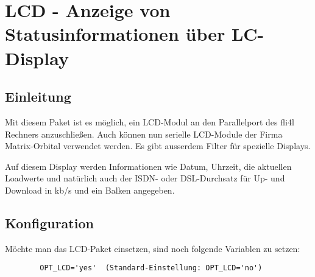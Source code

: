 {
  \section {LCD - Anzeige von Statusinformationen über LC-Display}
}

\subsection{Einleitung}


    Mit diesem Paket ist es möglich, ein LCD-Modul an den Parallelport des
    fli4l Rechners anzuschließen. Auch können nun serielle LCD-Module
    der Firma Matrix-Orbital verwendet werden.
    Es gibt ausserdem Filter für spezielle Displays.

    Auf diesem Display werden Informationen wie Datum, Uhrzeit, die aktuellen
    Loadwerte und natürlich auch der ISDN- oder DSL-Durchsatz für Up- und
    Download in kb/s und ein Balken angegeben.


\subsection{Konfiguration}


    Möchte man das LCD-Paket einsetzen, sind noch folgende Variablen zu
    setzen:

\begin{example}
\begin{verbatim}
        OPT_LCD='yes'  (Standard-Einstellung: OPT_LCD='no')
\end{verbatim}
\end{example}


